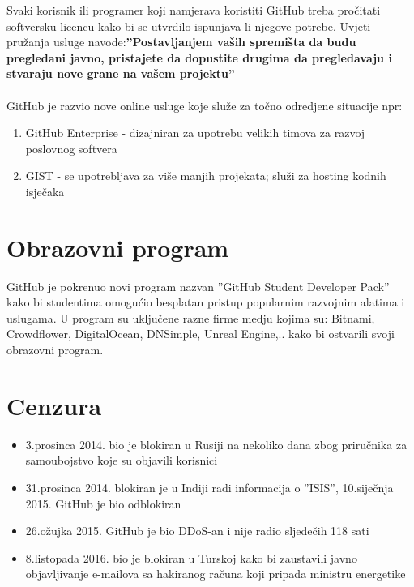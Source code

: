 \documentclass{article}
\begin{document}
		Svaki korisnik ili programer koji namjerava koristiti GitHub treba pročitati softversku licencu kako bi se utvrdilo ispunjava li
		njegove potrebe. Uvjeti pružanja usluge navode:\textbf{''Postavljanjem vaših spremišta da budu pregledani javno, pristajete da dopustite drugima da pregledavaju i stvaraju nove grane
		na vašem projektu''}
		\\
		\\
		GitHub je razvio nove online usluge koje služe za točno odredjene situacije npr:
		\begin{enumerate}
			\item GitHub Enterprise - dizajniran za upotrebu velikih timova za razvoj poslovnog softvera
			\item GIST - se upotrebljava za više manjih projekata; služi za hosting kodnih isječaka
		\end{enumerate}

	\section{\textbf {Obrazovni program}}
		GitHub je pokrenuo novi program nazvan ''GitHub Student Developer Pack'' kako bi studentima omogućio besplatan pristup popularnim razvojnim alatima i uslugama.
		U program su uključene razne firme medju kojima su: Bitnami, Crowdflower, DigitalOcean, DNSimple, Unreal Engine,.. kako bi ostvarili svoji obrazovni program.
		\\

	\section{\textbf {Cenzura}}
	\begin{itemize}
		\item 3.prosinca 2014. bio je blokiran u Rusiji na nekoliko dana zbog priručnika za samoubojstvo koje su objavili korisnici
		\item 31.prosinca 2014. blokiran je u Indiji radi informacija o ''ISIS'', 10.siječnja 2015. GitHub je bio odblokiran
		\item 26.ožujka 2015. GitHub je bio DDoS-an i nije radio sljedečih 118 sati
		\item 8.listopada 2016. bio je blokiran u Turskoj kako bi zaustavili javno objavljivanje e-mailova sa hakiranog računa koji pripada ministru energetike\\
	\end{itemize}
\end{document}
